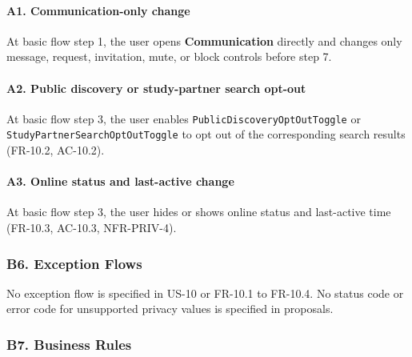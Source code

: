 \documentclass[12pt]{article}
\begin{document}
\paragraph*{A1. Communication-only change}
\par\medskip

At basic flow step 1, the user opens \textbf{Communication} directly and changes only message, request, invitation, mute, or block controls before step 7.
\par\medskip

\hypertarget{sec:a2-public-discovery-or-study-partner-search-opt-out}{}
\paragraph*{A2. Public discovery or study-partner search opt-out}
\par\medskip

At basic flow step 3, the user enables \texttt{PublicDiscoveryOptOutToggle} or \texttt{StudyPartnerSearchOptOutToggle} to opt out of the corresponding search results (FR-10.2, AC-10.2).
\par\medskip

\hypertarget{sec:a3-online-status-and-last-active-change}{}
\paragraph*{A3. Online status and last-active change}
\par\medskip

At basic flow step 3, the user hides or shows online status and last-active time (FR-10.3, AC-10.3, NFR-PRIV-4).
\par\medskip

\hypertarget{sec:b6-exception-flows}{}
\subsubsection*{B6. Exception Flows}
\par\medskip

No exception flow is specified in US-10 or FR-10.1 to FR-10.4. No status code or error code for unsupported privacy values is specified in proposals.
\par\medskip

\hypertarget{sec:b7-business-rules}{}
\subsubsection*{B7. Business Rules}
\par\medskip
\end{document}
